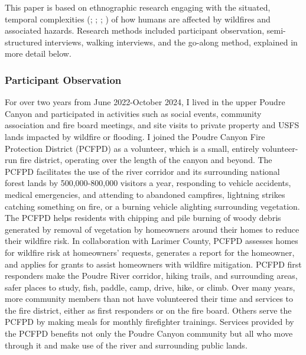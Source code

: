 \documentclass[
]{article}
\begin{document}
This paper is based on ethnographic research engaging with the situated, temporal complexities (; ; ; ) of how humans are affected by wildfires and associated hazards. Research methods included participant observation, semi-structured interviews, walking interviews, and the go-along method, explained in more detail below.

\subsubsection{Participant Observation}\label{participant-observation-1}

For over two years from June 2022-October 2024, I lived in the upper Poudre Canyon and participated in activities such as social events, community association and fire board meetings, and site visits to private property and USFS lands impacted by wildfire or flooding. I joined the Poudre Canyon Fire Protection District (PCFPD) as a volunteer, which is a small, entirely volunteer-run fire district, operating over the length of the canyon and beyond. The PCFPD facilitates the use of the river corridor and its surrounding national forest lands by 500,000-800,000 visitors a year, responding to vehicle accidents, medical emergencies, and attending to abandoned campfires, lightning strikes catching something on fire, or a burning vehicle alighting surrounding vegetation. The PCFPD helps residents with chipping and pile burning of woody debris generated by removal of vegetation by homeowners around their homes to reduce their wildfire risk. In collaboration with Larimer County, PCFPD assesses homes for wildfire risk at homeowners' requests, generates a report for the homeowner, and applies for grants to assist homeowners with wildfire mitigation. PCFPD first responders make the Poudre River corridor, hiking trails, and surrounding areas, safer places to study, fish, paddle, camp, drive, hike, or climb. Over many years, more community members than not have volunteered their time and services to the fire district, either as first responders or on the fire board. Others serve the PCFPD by making meals for monthly firefighter trainings. Services provided by the PCFPD benefits not only the Poudre Canyon community but all who move through it and make use of the river and surrounding public lands.
\end{document}
